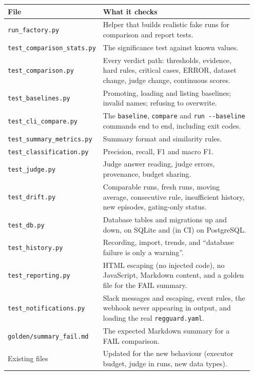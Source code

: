 \documentclass[11pt,a4paper]{article}
\newcommand{\code}[1]{\nolinkurl{#1}}
\begin{document}
\begin{longtable}{@{}p{0.28\linewidth}p{0.67\linewidth}@{}}
\toprule
\textbf{File} & \textbf{What it checks} \\
\midrule
\endhead
\code{run_factory.py} & Helper that builds realistic fake runs for comparison and report tests. \\
\code{test_comparison_stats.py} & The significance test against known values. \\
\code{test_comparison.py} & Every verdict path: thresholds, evidence, hard rules, critical cases, ERROR, dataset change, judge change, continuous scores. \\
\code{test_baselines.py} & Promoting, loading and listing baselines; invalid names; refusing to overwrite. \\
\code{test_cli_compare.py} & The \texttt{baseline}, \texttt{compare} and \texttt{run -{}-baseline} commands end to end, including exit codes. \\
\code{test_summary_metrics.py} & Summary format and similarity rules. \\
\code{test_classification.py} & Precision, recall, F1 and macro F1. \\
\code{test_judge.py} & Judge answer reading, judge errors, provenance, budget sharing. \\
\code{test_drift.py} & Comparable runs, fresh runs, moving average, consecutive rule, insufficient history, new episodes, gating-only status. \\
\code{test_db.py} & Database tables and migrations up and down, on SQLite and (in CI) on PostgreSQL. \\
\code{test_history.py} & Recording, import, trends, and ``database failure is only a warning''. \\
\code{test_reporting.py} & HTML escaping (no injected code), no JavaScript, Markdown content, and a golden file for the FAIL summary. \\
\code{test_notifications.py} & Slack messages and escaping, event rules, the webhook never appearing in output, and loading the real \code{regguard.yaml}. \\
\code{golden/summary_fail.md} & The expected Markdown summary for a FAIL comparison. \\
Existing files & Updated for the new behaviour (executor budget, judge in runs, new data types). \\
\bottomrule
\end{longtable}

\end{document}
